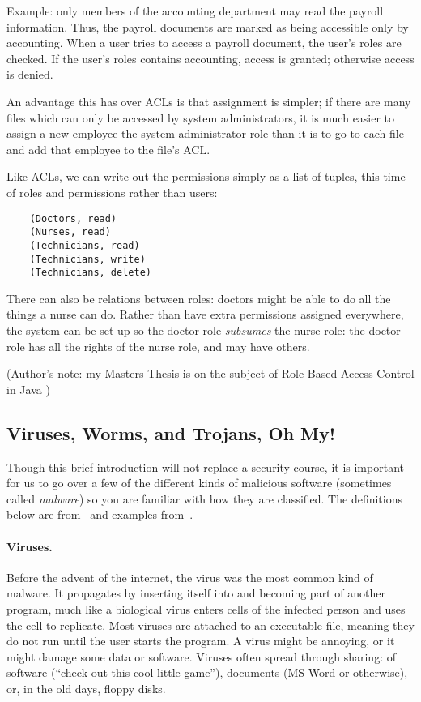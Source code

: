 Example: only members of the accounting department may read the payroll information. Thus, the payroll documents are marked as being accessible only by accounting. When a user tries to access a payroll document, the user's roles are checked. If the user's roles contains accounting, access is granted; otherwise access is denied.

An advantage this has over ACLs is that assignment is simpler; if there are many files which can only be accessed by system administrators, it is much easier to assign a new employee the system administrator role than it is to go to each file and add that employee to the file's ACL.

Like ACLs, we can write out the permissions simply as a list of tuples, this time of roles and permissions rather than users:
\begin{verbatim}
	(Doctors, read)
	(Nurses, read)
	(Technicians, read)
	(Technicians, write)
	(Technicians, delete)
\end{verbatim}

There can also be relations between roles: doctors might be able to do all the things a nurse can do. Rather than have extra permissions assigned everywhere, the system can be set up so the doctor role \textit{subsumes} the nurse role: the doctor role has all the rights of the nurse role, and may have others.

(Author's note: my Masters Thesis is on the subject of Role-Based Access Control in Java \cite{jzthesis})

\subsection*{Viruses, Worms, and Trojans, Oh My!}
Though this brief introduction will not replace a security course, it is important for us to go over a few of the different kinds of malicious software (sometimes called \textit{malware}) so you are familiar with how they are classified. The definitions below are from~\cite{cisco} and examples from~\cite{tenvirus}.

\paragraph{Viruses.}
Before the advent of the internet, the virus was the most common kind of malware. It propagates by inserting itself into and becoming part of another program, much like a biological virus enters cells of the infected person and uses the cell to replicate. Most viruses are attached to an executable file, meaning they do not run until the user starts the program. A virus might be annoying, or it might damage some data or software. Viruses often spread through sharing: of software (``check out this cool little game''), documents (MS Word or otherwise), or, in the old days, floppy disks. 

